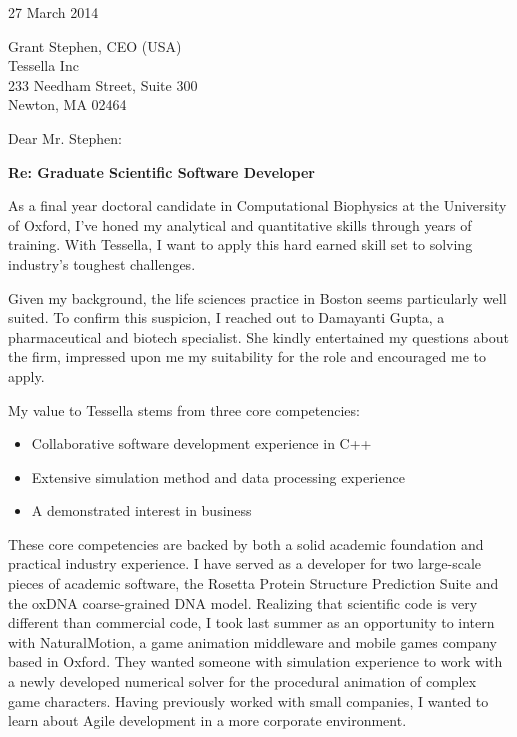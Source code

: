 \documentclass{../res}
\begin{document}
 
\begin{sloppypar}
 
%


\begin{resume} 
 
27 March 2014

Grant Stephen, CEO (USA) \\
Tessella Inc \\
233 Needham Street, Suite 300 \\
Newton, MA 02464

Dear Mr. Stephen: %

\textbf{Re: Graduate Scientific Software Developer}

As a final year doctoral candidate in Computational Biophysics at the University of Oxford, I've honed my analytical and quantitative skills through years of training. With Tessella, I want to apply this hard earned skill set to solving industry's toughest challenges. 

Given my background, the life sciences practice in Boston seems particularly well suited. To confirm this suspicion, I reached out to Damayanti Gupta, a pharmaceutical and biotech specialist. She kindly entertained my questions about the firm, impressed upon me my suitability for the role and encouraged me to apply.

My value to Tessella stems from three core competencies: 
\begin{itemize}[itemindent=1cm]
    \item Collaborative software development experience in C++
    \item Extensive simulation method and data processing experience
    \item A demonstrated interest in business
\end{itemize}

These core competencies are backed by both a solid academic foundation and practical industry experience. I have served as a developer for two large-scale pieces of academic software, the Rosetta Protein Structure Prediction Suite and the oxDNA coarse-grained DNA model. Realizing that scientific code is very different than commercial code, I took last summer as an opportunity to intern with NaturalMotion, a game animation middleware and mobile games company based in Oxford. They wanted someone with simulation experience to work with a newly developed numerical solver for the procedural animation of complex game characters. Having previously worked with small companies, I wanted to learn about Agile development in a more corporate environment. 


\end{resume}
\end{sloppypar}
\end{document}
